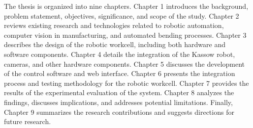 The thesis is organized into nine chapters. Chapter 1 introduces the background, problem statement, objectives, significance, and scope of the study. Chapter 2 reviews existing research and technologies related to robotic automation, computer vision in manufacturing, and automated bending processes. Chapter 3 describes the design of the robotic workcell, including both hardware and software components. Chapter 4 details the integration of the Kassow robot, cameras, and other hardware components. Chapter 5 discusses the development of the control software and web interface. Chapter 6 presents the integration process and testing methodology for the robotic workcell. Chapter 7 provides the results of the experimental evaluation of the system. Chapter 8 analyzes the findings, discusses implications, and addresses potential limitations. Finally, Chapter 9 summarizes the research contributions and suggests directions for future research.